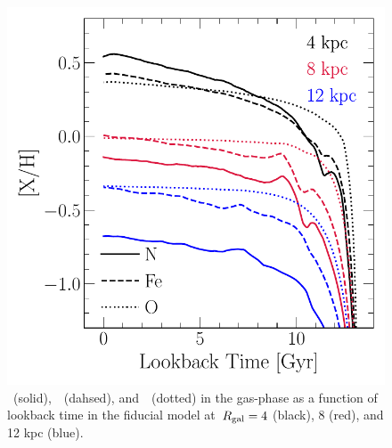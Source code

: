 \documentclass[ms.tex]{subfiles}
\begin{document}
\begin{figure}
\centering
\includegraphics[scale = 0.63]{nh_feh_vs_lookback.pdf}
\caption{
\nh~(solid),~\feh~(dahsed), and~\oh~(dotted) in the gas-phase as a function of
lookback time in the fiducial model at~$R_\text{gal} = 4$ (black), 8 (red), and 12 kpc
(blue).
}
\label{fig:nh_feh_vs_lookback}
\end{figure}
\end{document}
